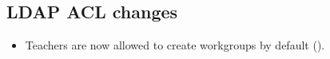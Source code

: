 \subsection{LDAP ACL changes}
\begin{itemize}
\item Teachers are now allowed to create workgroups by default ().
\end{itemize}
 




%


%

